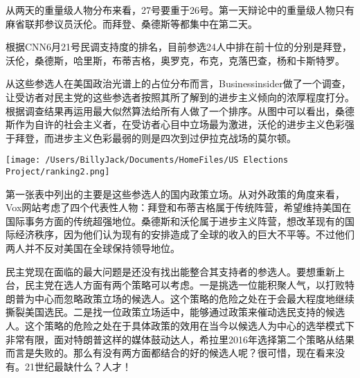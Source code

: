 \documentclass[]{article}
\begin{document}
从两天的重量级人物分布来看，27号要重于26号。第一天辩论中的重量级人物只有麻省联邦参议员沃伦。而拜登、桑德斯等都集中在第二天。

根据CNN6月21号民调支持度的排名，目前参选24人中排在前十位的分别是拜登，沃伦，桑德斯，哈里斯，布蒂吉格，奥罗克，布克，克落巴查，杨和卡斯特罗。

从这些参选人在美国政治光谱上的占位分布而言，Businessinsider做了一个调查，让受访者对民主党的这些参选者按照其所了解到的进步主义倾向的浓厚程度打分。根据调查结果再运用最大似然算法给所有人做了一个排序。从图中可以看出，桑德斯作为自许的社会主义者，在受访者心目中立场最为激进，沃伦的进步主义色彩强于拜登，而进步主义色彩最弱的则是四次到过伊拉克战场的莫尔顿。

\texttt{[image: /Users/BillyJack/Documents/HomeFiles/US Elections Project/ranking2.png]}

第一张表中列出的主要是这些参选人的国内政策立场。从对外政策的角度来看，Vox网站考虑了四个代表性人物：拜登和布蒂吉格属于传统阵营，希望维持美国在国际事务方面的传统超强地位。桑德斯和沃伦属于进步主义阵营，想改革现有的国际经济秩序，因为他们认为现有的安排造成了全球的收入的巨大不平等。不过他们两人并不反对美国在全球保持领导地位。

民主党现在面临的最大问题是还没有找出能整合其支持者的参选人。要想重新上台，民主党在选人方面有两个策略可以考虑。一是挑选一位能积聚人气，以打败特朗普为中心而忽略政策立场的候选人。这个策略的危险之处在于会最大程度地继续撕裂美国选民。二是找一位政策立场适中，能够通过政策来催动选民支持的候选人。这个策略的危险之处在于具体政策的效用在当今以候选人为中心的选举模式下非常有限，面对特朗普这样的媒体鼓动达人，希拉里2016年选择第二个策略从结果而言是失败的。那么有没有两方面都结合的好的候选人呢？很可惜，现在看来没有。21世纪最缺什么？人才！
\end{document}
